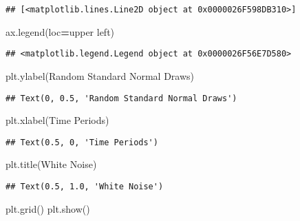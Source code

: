 \documentclass[
]{book}
\newenvironment{Shaded}{\begin{snugshade}}{\end{snugshade}}
\newcommand{\NormalTok}[1]{#1}
\newcommand{\OperatorTok}[1]{\textcolor[rgb]{0.81,0.36,0.00}{\textbf{#1}}}
\newcommand{\StringTok}[1]{\textcolor[rgb]{0.31,0.60,0.02}{#1}}
\begin{document}
\begin{verbatim}
## [<matplotlib.lines.Line2D object at 0x0000026F598DB310>]
\end{verbatim}

\begin{Shaded}
\begin{Highlighting}[]
\NormalTok{ax.legend(loc}\OperatorTok{=}\StringTok{\textquotesingle{}upper left\textquotesingle{}}\NormalTok{)}
\end{Highlighting}
\end{Shaded}

\begin{verbatim}
## <matplotlib.legend.Legend object at 0x0000026F56E7D580>
\end{verbatim}

\begin{Shaded}
\begin{Highlighting}[]
\NormalTok{plt.ylabel(}\StringTok{\textquotesingle{}Random Standard Normal Draws\textquotesingle{}}\NormalTok{)}
\end{Highlighting}
\end{Shaded}

\begin{verbatim}
## Text(0, 0.5, 'Random Standard Normal Draws')
\end{verbatim}

\begin{Shaded}
\begin{Highlighting}[]
\NormalTok{plt.xlabel(}\StringTok{\textquotesingle{}Time Periods\textquotesingle{}}\NormalTok{)}
\end{Highlighting}
\end{Shaded}

\begin{verbatim}
## Text(0.5, 0, 'Time Periods')
\end{verbatim}

\begin{Shaded}
\begin{Highlighting}[]
\NormalTok{plt.title(}\StringTok{\textquotesingle{}White Noise\textquotesingle{}}\NormalTok{)}
\end{Highlighting}
\end{Shaded}

\begin{verbatim}
## Text(0.5, 1.0, 'White Noise')
\end{verbatim}

\begin{Shaded}
\begin{Highlighting}[]
\NormalTok{plt.grid()}
\NormalTok{plt.show()}
\end{Highlighting}
\end{Shaded}
\end{document}
